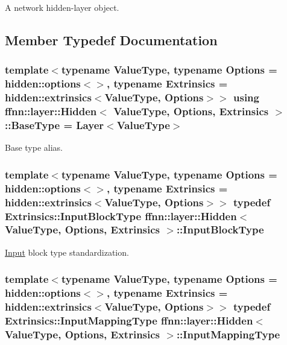 A network hidden-\/layer object. 

\subsection{Member Typedef Documentation}
\hypertarget{classffnn_1_1layer_1_1_hidden_a6369d3e45b700c257076cd955d50f9c3}{
\subsubsection[{Base\-Type}]{\setlength{\rightskip}{0pt plus 5cm}template$<$typename Value\-Type, typename Options = hidden\-::options$<$$>$, typename Extrinsics = hidden\-::extrinsics$<$\-Value\-Type, Options$>$$>$ using {\bf ffnn\-::layer\-::\-Hidden}$<$ Value\-Type, Options, Extrinsics $>$\-::{\bf Base\-Type} =  {\bf Layer}$<$Value\-Type$>$}}\label{classffnn_1_1layer_1_1_hidden_a6369d3e45b700c257076cd955d50f9c3}


Base type alias. 

\hypertarget{classffnn_1_1layer_1_1_hidden_abd5a3b5c55984948f903fe88759efaf4}{
\subsubsection[{Input\-Block\-Type}]{\setlength{\rightskip}{0pt plus 5cm}template$<$typename Value\-Type, typename Options = hidden\-::options$<$$>$, typename Extrinsics = hidden\-::extrinsics$<$\-Value\-Type, Options$>$$>$ typedef Extrinsics\-::\-Input\-Block\-Type {\bf ffnn\-::layer\-::\-Hidden}$<$ Value\-Type, Options, Extrinsics $>$\-::{\bf Input\-Block\-Type}}}\label{classffnn_1_1layer_1_1_hidden_abd5a3b5c55984948f903fe88759efaf4}


\hyperlink{classffnn_1_1layer_1_1_input}{Input} block type standardization. 

\hypertarget{classffnn_1_1layer_1_1_hidden_ac518f2e2be1250c1af7b2f8574cadc8d}{
\subsubsection[{Input\-Mapping\-Type}]{\setlength{\rightskip}{0pt plus 5cm}template$<$typename Value\-Type, typename Options = hidden\-::options$<$$>$, typename Extrinsics = hidden\-::extrinsics$<$\-Value\-Type, Options$>$$>$ typedef Extrinsics\-::\-Input\-Mapping\-Type {\bf ffnn\-::layer\-::\-Hidden}$<$ Value\-Type, Options, Extrinsics $>$\-::{\bf Input\-Mapping\-Type}}}\label{classffnn_1_1layer_1_1_hidden_ac518f2e2be1250c1af7b2f8574cadc8d}


